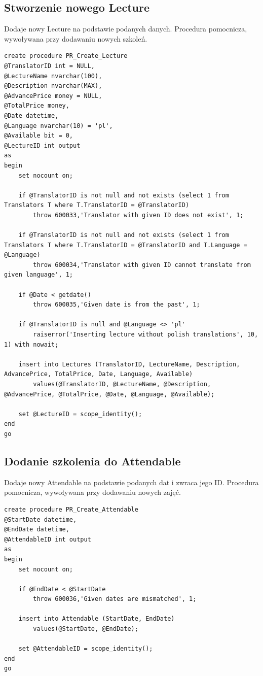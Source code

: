 \documentclass[11pt,a4paper]{article}
\begin{document}
\subsection{Stworzenie nowego Lecture}
Dodaje nowy Lecture na podstawie podanych danych. Procedura pomocnicza, wywoływana przy dodawaniu nowych szkoleń.
\begin{Verbatim}[breaklines=true]
create procedure PR_Create_Lecture 
@TranslatorID int = NULL,
@LectureName nvarchar(100),
@Description nvarchar(MAX),
@AdvancePrice money = NULL,
@TotalPrice money,
@Date datetime,
@Language nvarchar(10) = 'pl',
@Available bit = 0,
@LectureID int output
as
begin
    set nocount on;

    if @TranslatorID is not null and not exists (select 1 from Translators T where T.TranslatorID = @TranslatorID)
        throw 600033,'Translator with given ID does not exist', 1;

    if @TranslatorID is not null and not exists (select 1 from Translators T where T.TranslatorID = @TranslatorID and T.Language = @Language)
        throw 600034,'Translator with given ID cannot translate from given language', 1;

    if @Date < getdate()
        throw 600035,'Given date is from the past', 1;

    if @TranslatorID is null and @Language <> 'pl'
        raiserror('Inserting lecture without polish translations', 10, 1) with nowait;

    insert into Lectures (TranslatorID, LectureName, Description, AdvancePrice, TotalPrice, Date, Language, Available)
        values(@TranslatorID, @LectureName, @Description, @AdvancePrice, @TotalPrice, @Date, @Language, @Available);

    set @LectureID = scope_identity();
end
go
\end{Verbatim}

\subsection{Dodanie szkolenia do Attendable}
Dodaje nowy Attendable na podstawie podanych dat i zwraca jego ID. Procedura pomocnicza, wywoływana przy dodawaniu nowych zajęć.
\begin{Verbatim}[breaklines=true]
create procedure PR_Create_Attendable
@StartDate datetime,
@EndDate datetime,
@AttendableID int output
as
begin
    set nocount on;

    if @EndDate < @StartDate
        throw 600036,'Given dates are mismatched', 1;

    insert into Attendable (StartDate, EndDate)
        values(@StartDate, @EndDate);

    set @AttendableID = scope_identity();
end
go
\end{Verbatim}
\end{document}
